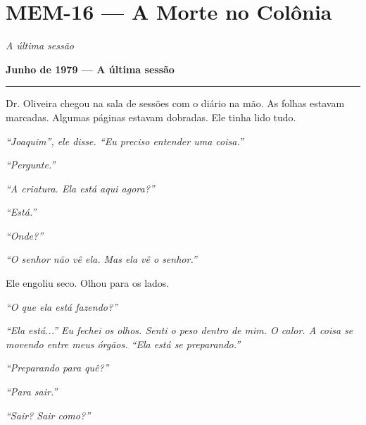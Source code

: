 \section*{\textbf{MEM-16} --- A Morte no Colônia}

\noindent \textit{A última sessão}

\noindent \textbf{Junho de 1979 --- A última sessão}

\vspace{0.5em}\noindent\rule{\textwidth}{0.5pt}\vspace{0.5em}

\noindent Dr. Oliveira chegou na sala de sessões com o diário na mão. As folhas estavam marcadas. Algumas páginas estavam dobradas. Ele tinha lido tudo.

\noindent \textit{\textquotedblleft{}Joaquim\textquotedblright{}\textit{, ele disse. }\textquotedblleft{}Eu preciso entender uma coisa.\textquotedblright{}}

\noindent \textit{\textquotedblleft{}Pergunte.\textquotedblright{}}

\noindent \textit{\textquotedblleft{}A criatura. Ela está aqui agora?\textquotedblright{}}

\noindent \textit{\textquotedblleft{}Está.\textquotedblright{}}

\noindent \textit{\textquotedblleft{}Onde?\textquotedblright{}}

\noindent \textit{\textquotedblleft{}O senhor não vê ela. Mas ela vê o senhor.\textquotedblright{}}

\noindent Ele engoliu seco. Olhou para os lados.

\noindent \textit{\textquotedblleft{}O que ela está fazendo?\textquotedblright{}}

\noindent \textit{\textquotedblleft{}Ela está...\textquotedblright{}\textit{ Eu fechei os olhos. Senti o peso dentro de mim. O calor. A coisa se movendo entre meus órgãos. }\textquotedblleft{}Ela está se preparando.\textquotedblright{}}

\noindent \textit{\textquotedblleft{}Preparando para quê?\textquotedblright{}}

\noindent \textit{\textquotedblleft{}Para sair.\textquotedblright{}}

\noindent \textit{\textquotedblleft{}Sair? Sair como?\textquotedblright{}}


